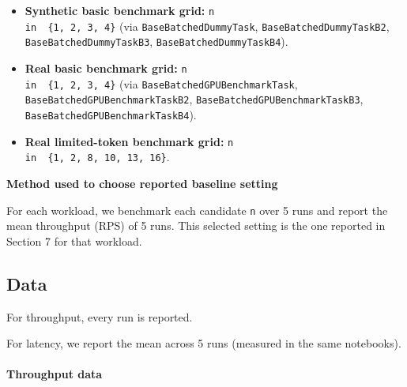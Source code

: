 \documentclass{article}
\providecommand{\tightlist}{\setlength{\itemsep}{0pt}\setlength{\parskip}{0pt}}
\begin{document}
\begin{itemize}
\tightlist
\item
  \textbf{Synthetic basic benchmark grid:}
  \texttt{n\ \\in \ \{1,\ 2,\ 3,\ 4\}} (via \texttt{BaseBatchedDummyTask},
  \texttt{BaseBatchedDummyTaskB2}, \texttt{BaseBatchedDummyTaskB3},
  \texttt{BaseBatchedDummyTaskB4}).
\item
  \textbf{Real basic benchmark grid:} \texttt{n\ \\in \ \{1,\ 2,\ 3,\ 4\}}
  (via \texttt{BaseBatchedGPUBenchmarkTask},
  \texttt{BaseBatchedGPUBenchmarkTaskB2},
  \texttt{BaseBatchedGPUBenchmarkTaskB3},
  \texttt{BaseBatchedGPUBenchmarkTaskB4}).
\item
  \textbf{Real limited-token benchmark grid:}
  \texttt{n\ \\in \ \{1,\ 2,\ 8,\ 10,\ 13,\ 16\}}.
\end{itemize}

\textbf{Method used to choose reported baseline setting}

For each workload, we benchmark each candidate \texttt{n} over 5 runs
and report the mean throughput (RPS) of 5 runs. This selected setting is
the one reported in Section 7 for that workload.

\hypertarget{72-data}{%
\subsection{Data}\label{72-data}}

For throughput, every run is reported.

For latency, we report the mean across 5 runs (measured in the same
notebooks).

\hypertarget{throughput-data}{%
\paragraph{Throughput data}\label{throughput-data}}

\begin{table}[t]
\caption{Throughput data: Synthetic Load. Source file: }
\label{throughput-synthetic}
\vskip 0.15in
\begin{center}
\begin{small}
\begin{sc}
\end{sc}
\end{small}
\end{center}
\vskip -0.1in
\end{table}
\end{document}
